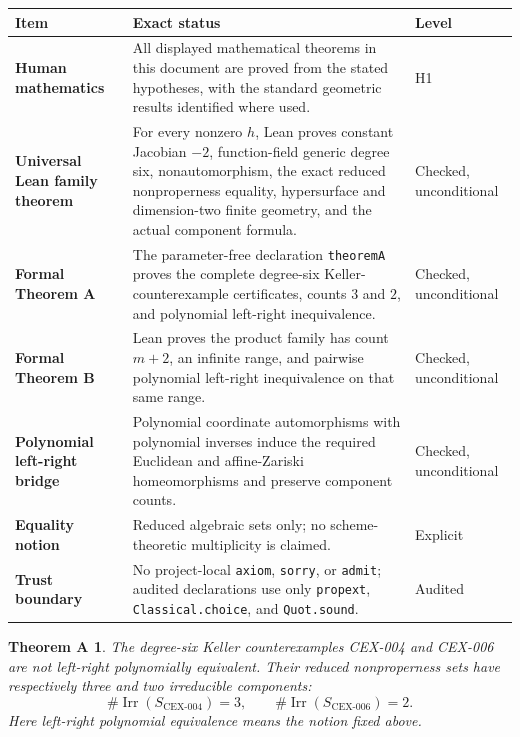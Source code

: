 \documentclass[11pt]{article}
\newtheorem*{theoremA}{Theorem A}
\newcommand{\Irr}{\operatorname{Irr}}
\begin{document}
\begin{center}
\begin{tabularx}{\textwidth}{>{\raggedright\arraybackslash\bfseries}p{}X >{\raggedright\arraybackslash}p{}}
\toprule
Item & Exact status & Level \\
\midrule
Human mathematics & All displayed mathematical theorems in this document are
proved from the stated hypotheses, with the standard geometric results
identified where used. & H1 \\
Universal Lean family theorem & For every nonzero $h$, Lean proves constant
Jacobian $-2$, function-field generic degree six, nonautomorphism, the exact
reduced nonproperness equality, hypersurface and dimension-two finite geometry,
and the actual component formula. & Checked, unconditional \\
Formal Theorem A & The parameter-free declaration \texttt{theoremA} proves the
complete degree-six Keller-counterexample certificates, counts $3$ and $2$,
and polynomial left-right inequivalence. & Checked, unconditional \\
Formal Theorem B & Lean proves the product family has count $m+2$, an infinite
range, and pairwise polynomial left-right inequivalence on that same range. &
Checked, unconditional \\
Polynomial left-right bridge & Polynomial coordinate automorphisms with
polynomial inverses induce the required Euclidean and affine-Zariski
homeomorphisms and preserve component counts. & Checked, unconditional \\
Equality notion & Reduced algebraic sets only; no scheme-theoretic
multiplicity is claimed. & Explicit \\
Trust boundary & No project-local \texttt{axiom}, \texttt{sorry}, or
\texttt{admit}; audited declarations use only \texttt{propext},
\texttt{Classical.choice}, and \texttt{Quot.sound}. & Audited \\
\bottomrule
\end{tabularx}
\end{center}

\begin{theoremA}
The degree-six Keller counterexamples CEX-004 and CEX-006 are not left-right
polynomially equivalent.  Their reduced nonproperness sets have respectively
three and two irreducible components:
\[
 \#\Irr(S_{\mathrm{CEX\text{-}004}})=3,
 \qquad
 \#\Irr(S_{\mathrm{CEX\text{-}006}})=2.
\]
Here left-right polynomial equivalence means the notion fixed above.
\end{theoremA}
\end{document}
